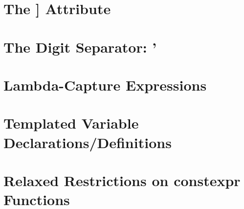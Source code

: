 \newpage
\section[{\tt deprecated}]{The {\SecCode [[deprecated]]} Attribute}\label{deprecated}\label{the-standard-[[deprecated]]-attribute}


\newpage
\section[Digit Separators]{The Digit Separator: {\SecCode '}}
\label{digitseparator} %
\label{digit-separators} %


\newpage
\section[Lambda Captures]{Lambda-Capture Expressions}\label{lambda-capture-expressions}


\newpage
\section[Variable Templates]{Templated Variable Declarations/Definitions}
\label{variable-templates}


\newpage
\section[{\tt constexpr} Functions '14]{Relaxed Restrictions on {\SecCode constexpr} Functions}\label{relaxed-constexpr-restrictions}%




